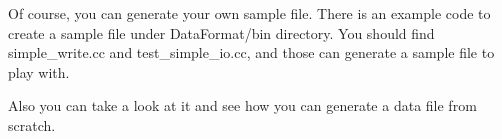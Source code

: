 
Of course, you can generate your own sample \ROOT file.
There is an example code to create a sample \ROOT file under DataFormat/bin directory. 
You should find {\ttfamily simple\_write.cc} and {\ttfamily test\_simple\_io.cc}, and those can generate a sample \ROOT file to play with.

Also you can take a look at it and see how you can generate a data file from scratch.
